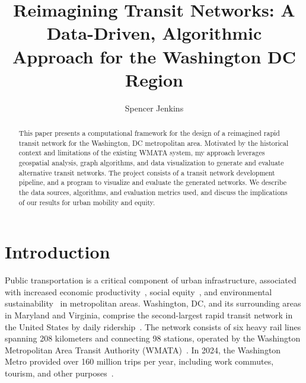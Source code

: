 \documentclass[manuscript]{acmart}
\begin{document}
\title{Reimagining Transit Networks: A Data-Driven, Algorithmic Approach for the Washington DC Region}

\author{Spencer Jenkins}


\renewcommand{\shortauthors}{Trovato et al.}

\begin{abstract}
This paper presents a computational framework for the design of a reimagined rapid transit network for the Washington, DC metropolitan area. Motivated by the historical context and limitations of the existing WMATA system, my approach leverages geospatial analysis, graph algorithms, and data visualization to generate and evaluate alternative transit networks. The project consists of a transit network development pipeline, and a program to visualize and evaluate the generated networks. We describe the data sources, algorithms, and evaluation metrics used, and discuss the implications of our results for urban mobility and equity.
\end{abstract}

\maketitle



\section{Introduction}

Public transportation is a critical component of urban infrastructure, associated with increased economic productivity~\cite{bib:prod}, social equity~\cite{bib:equity}, and environmental sustainability~\cite{bib:env} in metropolitan areas. Washington, DC, and its surrounding areas in Maryland and Virginia, comprise the second-largest rapid transit network in the United States by daily ridership~\cite{bib:wmata_stats}. The network consists of six heavy rail lines spanning 208 kilometers and connecting 98 stations, operated by the Washington Metropolitan Area Transit Authority (WMATA)~\cite{bib:wmata_stats}. In 2024, the Washington Metro provided over 160 million trips per year, including work commutes, tourism, and other purposes~\cite{bib:wmata_stats}.
\end{document}
